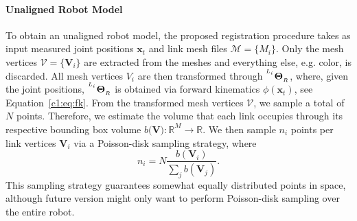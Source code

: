 \paragraph{Unaligned Robot Model}
\label{c1:sec:unaligned_robot_model}
To obtain an unaligned robot model, the proposed registration procedure takes as input measured joint positions $\mathbf{x}_t$ and link mesh files $\mathcal{M} = \{M_i\}$. Only the mesh vertices $\mathcal{V} = \{\mathbf{V}_i\}$ are extracted from the meshes and everything else, e.g. color, is discarded. All mesh vertices $V_i$ are then transformed through ${}^{^{L_i}}\mathbf{\Theta}_{_R}$, where, given the joint positions, ${}^{^{L_i}}\mathbf{\Theta}_{_R}$ is obtained via forward kinematics $\phi(\mathbf{x}_t)$, see Equation~\ref{c1:eq:fk}. From the transformed mesh vertices $\mathcal{V}$, we sample a total of $N$ points.
Therefore, we estimate the volume that each link occupies through its respective bounding box volume $b(\mathbf{{V}):\mathbb{R}}^M \rightarrow \mathbb{R}$. We then sample $n_i$ points per link vertices $\mathbf{V}_i$ via a Poisson-disk sampling strategy, where
\begin{equation}
    n_i = N\frac{b(\mathbf{V}_i)}{\sum_j b(\mathbf{V}_j)}.
\end{equation}
This sampling strategy guarantees somewhat equally distributed points in space, although future version might only want to perform Poisson-disk sampling over the entire robot.


